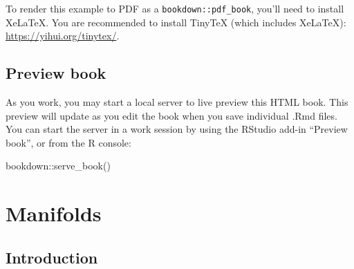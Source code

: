 \documentclass[
]{book}
\newenvironment{Shaded}{\begin{snugshade}}{\end{snugshade}}
\newcommand{\FunctionTok}[1]{\textcolor[rgb]{0.00,0.00,0.00}{#1}}
\newcommand{\NormalTok}[1]{#1}
\newcommand{\SpecialCharTok}[1]{\textcolor[rgb]{0.00,0.00,0.00}{#1}}
\begin{document}
To render this example to PDF as a \texttt{bookdown::pdf\_book}, you'll need to install XeLaTeX. You are recommended to install TinyTeX (which includes XeLaTeX): \url{https://yihui.org/tinytex/}.

\hypertarget{preview-book}{%
\section{Preview book}\label{preview-book}}

As you work, you may start a local server to live preview this HTML book. This preview will update as you edit the book when you save individual .Rmd files. You can start the server in a work session by using the RStudio add-in ``Preview book'', or from the R console:

\begin{Shaded}
\begin{Highlighting}[]
\NormalTok{bookdown}\SpecialCharTok{::}\FunctionTok{serve\_book}\NormalTok{()}
\end{Highlighting}
\end{Shaded}

\hypertarget{manifolds}{%
\chapter{Manifolds}\label{manifolds}}

\hypertarget{introduction}{%
\section{Introduction}\label{introduction}}
\end{document}
